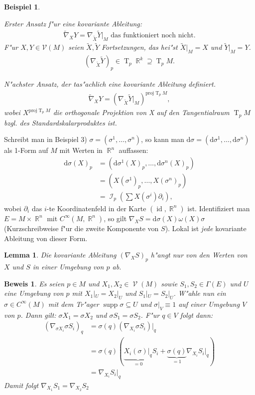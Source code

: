 \documentclass[paper=A4, twoside, chapterprefix=true, bibliography=totoc, headsepline]{scrbook}
\DeclareMathOperator{\R}{\mathbb{R}}
\DeclareMathOperator{\calI}{\mathcal{I}}
\DeclareMathOperator{\calV}{\mathcal{V}}
\DeclareMathOperator{\supp}{supp}   %
\DeclareMathOperator{\Id}{id}       %
\DeclareMathOperator{\T}{T}         %
\newcommand{\dop}{\mathrm{d}}
\newcommand{\X}{\times}
\theoremstyle{plain}
\newtheorem{Lemma}[Dfn]{Lemma}
\theoremstyle{nonumberplain}
\newtheorem{bsp}{Beispiel}
\newtheorem{bew}{Beweis}
\theoremstyle{empty}
\theoremstyle{break}
\begin{document}
\begin{bsp}
\begin{enumerate}[label=(\arabic*),leftmargin=*]
    Erster Ansatz f"ur eine kovariante Ableitung:
    \begin{align*}
      \tilde \nabla_XY = \nabla_{\tilde X}\tilde Y|_M \text{ das funktioniert noch nicht.}
    \end{align*}
    F"ur $X,Y \in \mathcal V(M)$ seien $\tilde X, \tilde Y$ Fortsetzungen, das hei"st $\tilde X|_M = X$ und $\tilde Y|_M = Y$.
    \begin{align*}
      (\nabla_{\tilde X}\tilde Y)_p \in \T_p\R^k \supseteq \T_pM.
    \end{align*}

    N"achster Ansatz, der tas"achlich eine kovariante Ableitung definiert.
    \begin{align*}
      \tilde \nabla_XY = (\nabla_{\tilde X}\tilde Y|_M)^{\text{proj}\T_pM},
    \end{align*}
    wobei $X^{\text{proj}\T_pM}$ die orthogonale Projektion von X auf den Tangentialraum $\T_pM$ bzgl. des Standardskalarproduktes ist.
  \end{enumerate}
\end{bsp}

Schreibt man in Beispiel 3) $\sigma = ( \sigma^1, \ldots ,\sigma^n)$, so kann man $\dop \sigma = (\dop \sigma^1,\ldots ,\dop\sigma^n)$ als 1-Form auf $M$ mit Werten in $\R^n$ auffassen:
\begin{align*}
  \dop \sigma(X)_p &= (\dop \sigma^1(X)_p,\ldots , \dop \sigma^n(X)_p)\\
  &= (X(\sigma^1)_p,\ldots ,X(\sigma^n)_p)\\
  &= \calI_p(\sum X(\sigma^{i}) \partial_i),
\end{align*}
wobei $\partial_i$ das $i$-te Koordinatenfeld in der Karte $(\Id, \R^n)$ ist.
Identifiziert man $E = M \X \R^n$ mit $C^{\infty}(M, \R^n)$, so gilt $\nabla_X S = \dop \sigma(X) \omega(X) \sigma$ (Kurzschreibweise f"ur die zweite Komponente von $S$). 
Lokal ist \emph{jede} kovariante Ableitung von dieser Form.

\begin{Lemma}
  Die kovariante Ableitung $(\nabla_XS)_p$ h"angt nur von den Werten von $X$ und $S$ in einer Umgebung von $p$ ab.
\end{Lemma}

\begin{bew}
  Es seien $p \in M$ und $X_1, X_2 \in \calV(M)$ sowie $S_1, S_2 \in \Gamma(E)$ und $U$ eine Umgebung von $p$ mit $X_1|_U = X_2|_U$ und $S_1|_U = S_2|_U$. 
  W"ahle nun ein $\sigma \in C^{\infty}(M)$ mit dem Tr"ager $\supp \sigma \subseteq U$ und $\sigma|_V \equiv 1$ auf einer Umgebung $V$ von $p$.
  Dann gilt: $\sigma X_1 = \sigma X_2$ und $\sigma S_1 = \sigma S_2$. F"ur $q \in V$ folgt dann:
  \begin{align*}
    (\nabla_{\sigma X_i} \sigma S_i)_q &= \sigma(q)(\nabla_{X_i} \sigma S_i)|_q\\
    &= \sigma(q)(\underbrace{X_i(\sigma)|_q}_{=0} S_i + \underbrace{\sigma(q)}_{=1}\nabla_{X_i} S_i|_q)\\
    &= \nabla_{X_i} S_i|_q
  \end{align*}
  Damit folgt $\nabla_{X_1} S_1 = \nabla_{X_2} S_2$
\end{bew}
\end{document}
